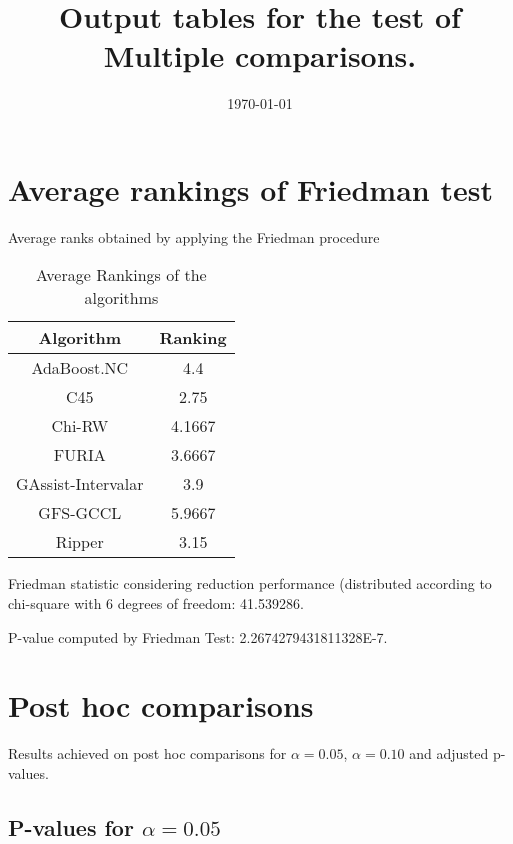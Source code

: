 \documentclass[a4paper,10pt]{article}
\title{Output tables for the test of Multiple comparisons.}
\author{}
\date{\today}
\begin{document}
\pagestyle{empty}
\maketitle
\thispagestyle{empty}
\section{Average rankings of Friedman test}



Average ranks obtained by applying the Friedman procedure

\begin{table}[!htp]
\centering
\begin{tabular}{|c|c|}\hline
Algorithm&Ranking\\\hline
 AdaBoost.NC  & 4.4\\
 C45  & 2.75\\
 Chi-RW  & 4.1667\\
 FURIA  & 3.6667\\
 GAssist-Intervalar  & 3.9\\
 GFS-GCCL  & 5.9667\\
 Ripper & 3.15\\
\hline
\end{tabular}
\caption{Average Rankings of the algorithms}
\end{table}

Friedman statistic considering reduction performance (distributed according to chi-square with 6 degrees of freedom: 41.539286.

P-value computed by Friedman Test: 2.2674279431811328E-7.\newline



\pagebreak

\section{Post hoc comparisons}

Results achieved on post hoc comparisons for $\alpha = 0.05$, $\alpha = 0.10$ and adjusted p-values.

\subsection{P-values for $\alpha=0.05$}
\end{document}
